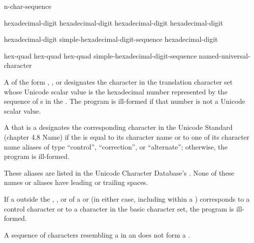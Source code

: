 \begin{bnf}
\br
     n-char-sequence \terminal{\}}
\end{bnf}

\begin{bnf}
\br
    hexadecimal-digit hexadecimal-digit hexadecimal-digit hexadecimal-digit
\end{bnf}

\begin{bnf}
\br
    hexadecimal-digit\br
    simple-hexadecimal-digit-sequence hexadecimal-digit
\end{bnf}

\begin{bnf}
\br
     hex-quad\br
     hex-quad hex-quad\br
     simple-hexadecimal-digit-sequence \terminal{\}}\br
    named-universal-character
\end{bnf}

\pnum
A 
of the form  ,
  , or
designates the character in the translation character set
whose Unicode scalar value is the hexadecimal number represented by
the sequence of s
in the .
The program is ill-formed if that number is not a Unicode scalar value.

\pnum
A 
that is a 
designates the corresponding character
in the Unicode Standard (chapter 4.8 Name)
if the  is equal
to its character name or
to one of its character name aliases of
type ``control'', ``correction'', or ``alternate'';
otherwise, the program is ill-formed.
\begin{note}
These aliases are listed in
the Unicode Character Database's .
None of these names or aliases have leading or trailing spaces.
\end{note}

\pnum
If a  outside
the , , or
 of
a  or 
(in either case, including within a )
corresponds to a control character or
to a character in the basic character set, the program is ill-formed.
\begin{note}
A sequence of characters resembling a  in an
 does not form a
.
\end{note}

